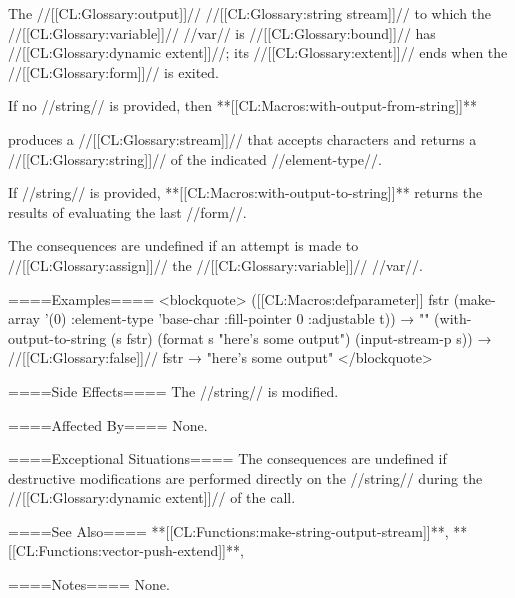 The //[[CL:Glossary:output]]// //[[CL:Glossary:string stream]]// to which the //[[CL:Glossary:variable]]// //var// is //[[CL:Glossary:bound]]// has //[[CL:Glossary:dynamic extent]]//; its //[[CL:Glossary:extent]]// ends when the //[[CL:Glossary:form]]// is exited.

If no //string// is provided, then **[[CL:Macros:with-output-from-string]]**

produces a //[[CL:Glossary:stream]]// that accepts characters and returns a //[[CL:Glossary:string]]// of the indicated //element-type//.

If //string// is provided, **[[CL:Macros:with-output-to-string]]** returns the results of evaluating the last //form//.

The consequences are undefined if an attempt is made to //[[CL:Glossary:assign]]// the //[[CL:Glossary:variable]]// //var//.

====Examples==== <blockquote> ([[CL:Macros:defparameter]] fstr (make-array '(0) :element-type 'base-char :fill-pointer 0 :adjustable t)) → "" (with-output-to-string (s fstr) (format s "here's some output") (input-stream-p s)) → //[[CL:Glossary:false]]// fstr → "here's some output" </blockquote>

====Side Effects====
The //string// is modified.

====Affected By====
None.

====Exceptional Situations====
The consequences are undefined if destructive modifications are performed directly on the //string// during the //[[CL:Glossary:dynamic extent]]// of the call.

====See Also====
**[[CL:Functions:make-string-output-stream]]**, **[[CL:Functions:vector-push-extend]]**,

{\secref\TraversalRules}

====Notes====
None.

          
